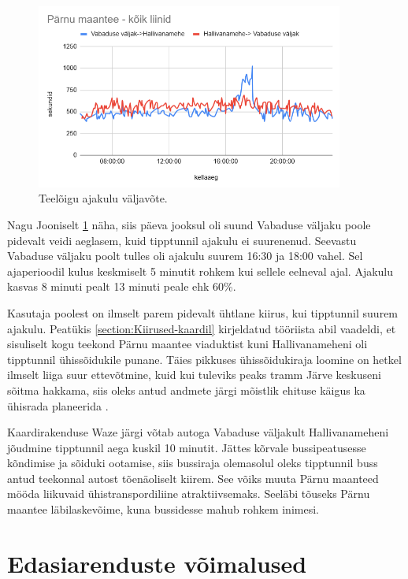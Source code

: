 \begin{figure}[h!]
    \centering
    \includegraphics[width=0.9\textwidth]{figures/parnumnt.png}
    \caption{Teelõigu ajakulu väljavõte.}
    \label{fig:parnumnt}
\end{figure}

Nagu Jooniselt \ref{fig:parnumnt} näha, siis päeva jooksul oli suund Vabaduse väljaku poole pidevalt veidi aeglasem, kuid tipptunnil ajakulu ei suurenenud. Seevastu Vabaduse väljaku poolt tulles oli ajakulu suurem 16:30 ja 18:00 vahel. Sel ajaperioodil kulus keskmiselt 5 minutit rohkem kui sellele eelneval ajal. Ajakulu kasvas 8 minuti pealt 13 minuti peale ehk 60\%. 

Kasutaja poolest on ilmselt parem pidevalt ühtlane kiirus, kui tipptunnil  suurem ajakulu. Peatükis \ref{section:Kiirused-kaardil} kirjeldatud tööriista abil vaadeldi, et sisuliselt kogu teekond Pärnu maantee viaduktist kuni Hallivanameheni oli tipptunnil ühissõidukile punane. Täies pikkuses ühissõidukiraja loomine on hetkel ilmselt liiga suur ettevõtmine, kuid kui tuleviks peaks tramm Järve keskuseni sõitma hakkama, siis oleks  antud andmete järgi mõistlik ehituse käigus ka ühisrada planeerida \cite{err_jarve_tramm_2024}.

Kaardirakenduse Waze \cite{waze} järgi võtab autoga Vabaduse väljakult Hallivanameheni jõudmine tipptunnil aega kuskil 10 minutit. Jättes kõrvale bussipeatusesse kõndimise ja sõiduki ootamise, siis bussiraja olemasolul oleks tipptunnil buss antud teekonnal autost tõenäoliselt kiirem.  See võiks muuta Pärnu maanteed mööda liikuvaid ühistranspordiliine atraktiivsemaks. Seeläbi tõuseks Pärnu maantee läbilaskevõime, kuna bussidesse mahub rohkem inimesi.

\section{Edasiarenduste võimalused}

